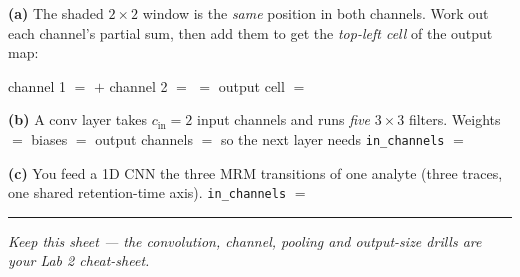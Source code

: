 \documentclass[11pt]{article}
\newif\ifsolution
\newcommand{\blk}[1]{\underline{\hspace{#1}}}
\newcommand{\rb}[2]{\ifsolution\textbf{#1}\else\blk{#2}\fi}
\newcommand{\keybox}[1]{\ifsolution\par\vspace{2pt}%
  \fbox{\parbox{0.965\textwidth}{\small\textbf{Answer.}\; #1}}\par\fi}
\newcommand{\work}[1]{\ifsolution\else\vspace{#1}\fi}
\begin{document}
\vspace{2pt}
\textbf{(a)} The shaded $2\times2$ window is the \emph{same} position in both channels. Work out each
channel's partial sum, then add them to get the \emph{top-left cell} of the output map:

\vspace{2pt}
\quad channel 1 $=$ \rb{$8$}{1.5cm} \hfill $+$ \hfill channel 2 $=$ \rb{$3$}{1.5cm} \hfill $=$ \hfill
output cell $=$ \rb{$11$}{1.5cm} \hspace*{0.6cm}

\work{1.3cm}

\textbf{(b)} A conv layer takes $c_{\text{in}}=2$ input channels and runs \emph{five} $3\times3$
filters. Weights $=$ \rb{$90$}{1.5cm} \; biases $=$ \rb{$5$}{1.1cm} \; output channels $=$
\rb{$5$}{1.1cm} \; so the next layer needs \texttt{in\_channels} $=$ \rb{$5$}{1.1cm}

\work{0.9cm}

\textbf{(c)} You feed a 1D CNN the three MRM transitions of one analyte (three traces, one shared
retention-time axis). \texttt{in\_channels} $=$ \rb{$3$}{1.1cm}

\work{0.6cm}

\keybox{(a) Each channel's window times its own slice, then \emph{add}:
channel 1 $= 1\!\cdot\!1 + 2\!\cdot\!2 + 0\!\cdot\!0 + 3\!\cdot\!1 = \mathbf{8}$;
channel 2 $= 2\!\cdot\!0 + 1\!\cdot\!1 + 1\!\cdot\!2 + 0\!\cdot\!0 = \mathbf{3}$;
output cell $= 8 + 3 = \mathbf{11}$. The sum across channels happens \emph{inside every cell} --- the
filter is one $2\times2\times2$ block of 8 weights, not two separate filters.\\[3pt]
(b) Kernel tensor $c_{\text{out}}\times c_{\text{in}}\times k\times k = 5\times2\times3\times3 =
\mathbf{90}$ weights, one bias per filter $=\mathbf{5}$ (95 parameters), and five filters make
\textbf{5} output maps --- so the next layer must declare \texttt{in\_channels}$=\mathbf{5}$.\\[3pt]
(c) \textbf{3} --- three co-recorded traces on one axis are three input channels, so one filter can
use all three transitions at once. (\texttt{out\_channels} stays your choice: it is just how many
filters you run.)}

\vspace{4pt}\hrule\vspace{3pt}
{\small\itshape \ifsolution Answer key.\else Keep this sheet --- the convolution, channel, pooling
and output-size drills are your Lab 2 cheat-sheet.\fi}
\end{document}
